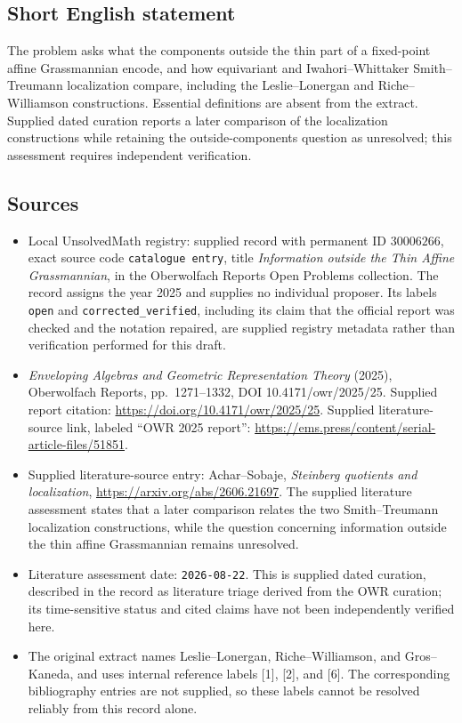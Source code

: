 \documentclass[11pt]{article}
\begin{document}
\subsection{Short English statement}
The problem asks what the components outside the thin part of a fixed-point affine Grassmannian encode, and how equivariant and Iwahori--Whittaker Smith--Treumann localization compare, including the Leslie--Lonergan and Riche--Williamson constructions. Essential definitions are absent from the extract. Supplied dated curation reports a later comparison of the localization constructions while retaining the outside-components question as unresolved; this assessment requires independent verification.
\subsection{Sources}
\begin{itemize}
\item Local UnsolvedMath registry: supplied record with permanent ID \(30006266\), exact source code \texttt{catalogue entry}, title \emph{Information outside the Thin Affine Grassmannian}, in the Oberwolfach Reports Open Problems collection. The record assigns the year 2025 and supplies no individual proposer. Its labels \texttt{open} and \texttt{corrected\_verified}, including its claim that the official report was checked and the notation repaired, are supplied registry metadata rather than verification performed for this draft.
\item \emph{Enveloping Algebras and Geometric Representation Theory} (2025), Oberwolfach Reports, pp.\ 1271--1332, DOI 10.4171/owr/2025/25. Supplied report citation: \url{https://doi.org/10.4171/owr/2025/25}. Supplied literature-source link, labeled ``OWR 2025 report'': \url{https://ems.press/content/serial-article-files/51851}.
\item Supplied literature-source entry: Achar--Sobaje, \emph{Steinberg quotients and localization}, \url{https://arxiv.org/abs/2606.21697}. The supplied literature assessment states that a later comparison relates the two Smith--Treumann localization constructions, while the question concerning information outside the thin affine Grassmannian remains unresolved.
\item Literature assessment date: \texttt{2026-08-22}. This is supplied dated curation, described in the record as literature triage derived from the OWR curation; its time-sensitive status and cited claims have not been independently verified here.
\item The original extract names Leslie--Lonergan, Riche--Williamson, and Gros--Kaneda, and uses internal reference labels [1], [2], and [6]. The corresponding bibliography entries are not supplied, so these labels cannot be resolved reliably from this record alone.
\end{itemize}
\end{document}
